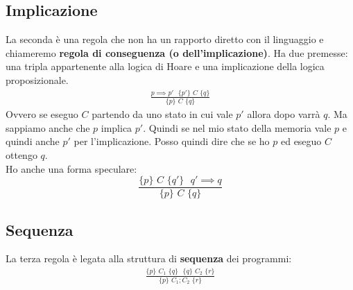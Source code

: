 \subsection{Implicazione}
\begin{definizione}
	La seconda è una regola che non ha un rapporto diretto con il linguaggio e
	chiameremo \textbf{regola di conseguenza (o dell'implicazione)}. Ha due
	premesse: una tripla appartenente alla logica di Hoare e una implicazione della
	logica proposizionale.
	\begin{align}\label{ImplicationRule}
		\frac{p\implies p'\,\, \,\,\{p'\}\,\,C\,\,\{q\}}{\{p\}\,\,C\,\,\{q\}} 
	\end{align}
	Ovvero se eseguo $C$ partendo da uno stato in cui vale $p'$ allora dopo varrà
	$q$. Ma sappiamo anche che $p$ implica $p'$. Quindi se nel mio stato della
	memoria vale $p$ e quindi anche $p'$ per l'implicazione. Posso quindi dire che
	se ho $p$ ed eseguo $C$ ottengo $q$.\\
	Ho anche una forma speculare:
	\[\frac{\{p\}\,\,C\,\,\{q'\}\,\, \,\,q'\implies q}{\{p\}\,\,C\,\,\{q\}}\]
\end{definizione}
\subsection{Sequenza}
\begin{definizione}
	La terza regola è legata alla struttura di \textbf{sequenza} dei programmi:
	\begin{align}\label{SequenceRule}
		\frac{\{p\}\,\,C_1\,\,\{q\}\,\,                       
		\,\,\{q\}\,\,C_2\,\,\{r\}}{\{p\}\,\,C_1;C_2\,\,\{r\}} 
	\end{align}
		  
		
\end{definizione}
